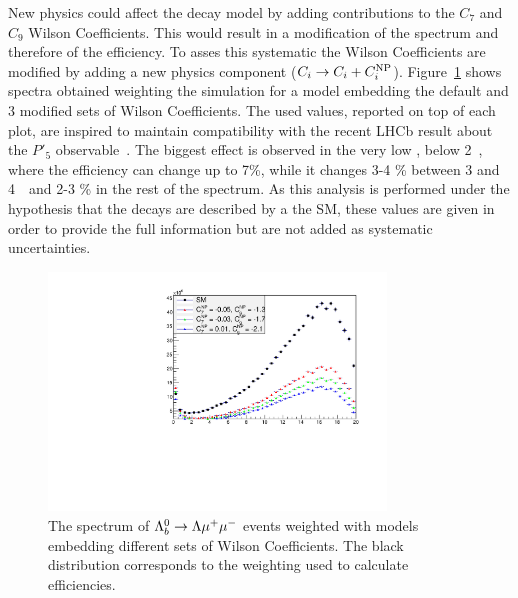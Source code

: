 New physics could affect the decay model by adding contributions to the $C_7$ and $C_9$ 
Wilson Coefficients. This would result in a modification of the \qsq spectrum and therefore of the efficiency.
To asses this systematic the Wilson Coefficients are modified by adding a new physics component
($C_i \rightarrow C_i + C_i^{ \rm NP}$). Figure~\ref{fig:wilson_q2} shows \qsq spectra
obtained weighting the simulation for a model embedding the default and 3 modified sets
of Wilson Coefficients. The used values, reported on top of each plot, are inspired
to maintain compatibility with the recent LHCb result about the $P'_5$ observable~\cite{Descotes-Genon:2013wba}.
The biggest effect is observed in the very low \qsq, below 2~\gevgevcccc, where the efficiency can change
up to 7\%, while it changes 3-4 \% between 3 and 4~\gevgevcccc~and 2-3 \% in the rest of the spectrum.
As this analysis is performed under the hypothesis that the decays are described by a the SM,
these values are given in order to provide the full information but are not added 
as systematic uncertainties. 

\begin{figure}
\centering
\includegraphics[width=0.8\textwidth]{Lmumu/figs/wilson_q2.pdf}
\caption{The \qsq spectrum of $\Lambda^0_b\rightarrow\Lambda\mu^+\mu^-$ events weighted with models embedding different sets of Wilson Coefficients.
The black distribution corresponds to the weighting used to calculate efficiencies.}
\label{fig:wilson_q2}
\end{figure}


